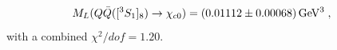 \documentclass[12pt,a4paper,final]{iopart}
\newcommand{\barQ}{{\bar{Q}}}
\newcommand{\charm}{{\rm{charm}}}
\begin{document}
\begin{equation}
  \begin{split}
    M_{L}(Q\barQ([^3S_1]_{8})\rightarrow \chi_{c0}) & 
    = (0.01112\pm {\color{black} 0.00068})\,{\rm GeV^3}\;,
    \label{eq:Mchicn1CO_val}
  \end{split}
\end{equation}
with a combined {\color{black} $\chi^2/dof=1.20$}. 
\end{document}
